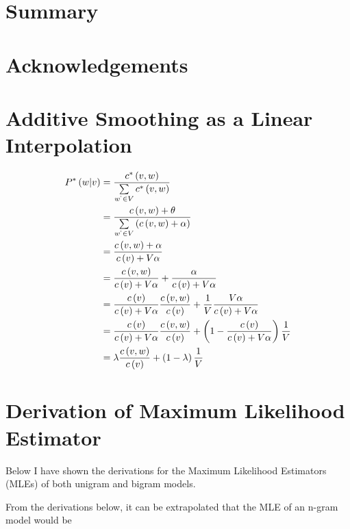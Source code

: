 \documentclass[11pt]{article}
\begin{document}
\section{Summary}

\section{Acknowledgements}




\appendix
\section{Additive Smoothing as a Linear Interpolation}

\begin{align}
P^*\left(w \vert v \right) &= \frac{c^*\left(v, w\right)}{\sum\limits_{w^` \in V} c^*\left(v, w \right)} \\
&= \frac{c \left( v, w \right) + \theta}{\sum\limits_{w^` \in V} \left( c\left( v, w \right) + \alpha \right)} \\
&= \frac{c \left( v, w \right) + \alpha}{c \left( v \right) + V\alpha} \\
&= \frac{c\left(v, w\right)}{c\left( v \right) + V\alpha} + \frac{\alpha}{c\left( v \right) + V\alpha} \\
&= \frac{c\left( v\right)}{c\left( v\right) + V\alpha} \frac{c\left(v, w\right)}{c\left( v \right)} + \frac{1}{V} \frac{V\alpha}{c\left( v \right) + V\alpha} \\
&= \frac{c\left( v\right)}{c\left( v\right) + V\alpha} \frac{c\left(v, w\right)}{c\left( v \right)} + \left( 1 - \frac{c\left( v\right)}{c\left( v\right) + V\alpha} \right) \frac{1}{V} \\
&= \lambda \frac{c\left(v, w\right)}{c\left( v \right)} + \left(1-\lambda\right) \frac{1}{V}
\end{align}

\section{Derivation of Maximum Likelihood Estimator}

Below I have shown the derivations for the Maximum Likelihood Estimators (MLEs) of both unigram and bigram models.

From the derivations below, it can be extrapolated that the MLE of an n-gram model would be
\end{document}
